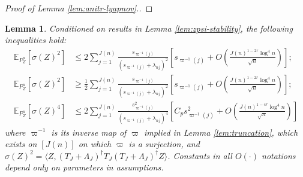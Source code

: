 \documentclass[11pt,a4paper]{article}
\renewcommand{\hat}{\widehat}
\theoremstyle{definition}
\theoremstyle{plain}
\newtheorem{lemma}{Lemma}[section]
\theoremstyle{remark}
\newcommand{\ud}{\mathrm d}
\begin{document}
\begin{proof}[Proof of Lemma \ref{lem:anitr-lyapnov}.]
\end{proof}

\begin{lemma}
Conditioned on results in Lemma \ref{lem:zpsi-stability}, the following inequalities hold:
\begin{align*}
\mathbb E_{P_Z^n}[\sigma(Z)^2] &\leq 2\sum_{j=1}^{J(n)}\frac{s_{\varpi^{-1}(j)}}{(s_{\varpi^{-1}(j)}+\lambda_{nj})^2}\left[s_{\varpi^{-1}(j)} + O\left(\frac{J(n)^{1-2r}\log^4 n}{\sqrt{n}}\right)\right];\\
\mathbb E_{P_Z^n}[\sigma(Z)^2] &\geq \frac{1}{2}\sum_{j=1}^{J(n)}\frac{s_{\varpi^{-1}(j)}}{(s_{\varpi^{-1}(j)}+\lambda_{nj})^2}\left[s_{\varpi^{-1}(j)} + O\left(\frac{J(n)^{1-2r}\log^4 n}{\sqrt{n}}\right)\right];\\
\mathbb E_{P_Z^n}[\sigma(Z)^4] &\leq 2\sum_{j=1}^{J(n)}\frac{s_{\varpi^{-1}(j)}^2}{(s_{\varpi^{-1}(j)}+\lambda_{nj})^4}\left[C_p s_{\varpi^{-1}(j)}^2 + O\left(\frac{J(n)^{1-4r}\log^4 n}{\sqrt{n}}\right)\right]
\end{align*}
where $\varpi^{-1}$ is its inverse map of $\varpi$ implied in Lemma \ref{lem:truncation}, which exists on $[J(n)]$ on which $\varpi$ is a surjection,
and $\sigma(Z)^2 = \langle Z, (T_J+\Lambda_J)^\dagger T_J(T_J+\Lambda_J)^\dagger Z\rangle$.
Constants in all $O(\cdot)$ notations depend only on parameters in assumptions.
\label{lem:variance-stability}
\end{lemma}
\end{document}
